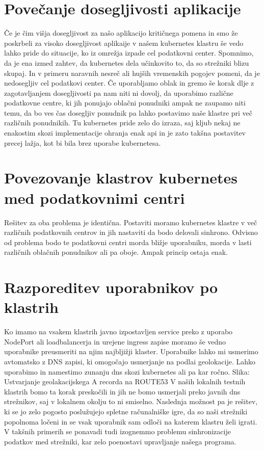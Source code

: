 \documentclass[a4paper, 12pt]{book}
\begin{document}
\section{Povečanje dosegljivosti aplikacije}
Če je čim višja dosegljivost za našo aplikacijo kritičnega pomena in smo že poskrbeli za visoko dosegljivost aplikaije v našem kubernetes klastru še vedo lahko pride do situacije, ko iz omrežja izpade cel podatkovni center.
Spomnimo, da je ena izmed zahtev, da kubernetes dela učinkovito to, da so strežniki blizu skupaj.
In v primeru naravnih nesreč ali hujših vremenskih pogojev pomeni, da je nedosegljiv cel podatkovi center.
Če uporabljamo oblak in gremo še korak dlje z zagotavljanjem dosegljivosti pa nam niti ni dovolj, da uporabimo različne podatkovne centre, ki jih ponujajo oblačni ponudniki ampak ne zaupamo niti temu, da bo ves čas dosegljiv ponudnik pa lahko postavimo naše klastre pri več različnih ponudnikih.
Tu kubernetes pride zelo do izraza, saj kljub nekaj ne enakostim skozi implementacije ohranja enak api in je zato takšna postavitev precej lažja, kot bi bila brez uporabe kubernetesa.
\section{Povezovanje klastrov kubernetes med podatkovnimi centri}
Rešitev za oba problema je identična.
Postaviti moramo kubernetes klastre v več različnih podatkovnih centrov in jih nastaviti da bodo delovali sinhrono. Odvisno od problema bodo te podatkovni centri morda bližje uporabniku, morda v lasti različnih oblačnih ponudnikov ali pa oboje. Ampak princip ostaja enak.
\section{Razporeditev uporabnikov po klastrih}
Ko imamo na vsakem klastrih javno izpostavljen service preko z uporabo NodePort ali loadbalancerja in urejene ingress zapise moramo še vedno uporabnike preusmeriti na njim najbljižji klaster.
Uporabnike lahko mi usmerimo avtomatsko z DNS zapisi, ki omogočajo usmerjanje na podlai geolokacije.
Lahko uporabimo in namestimo zunanju dns skozi kubernetes ali pa kar ročno.
Slika: Ustvarjanje geolakacijskega A recorda na ROUTE53
V naših lokalnih testnih klastrih bomo ta korak preskočili in jih ne bomo usmerjali preko javnih dns strežnikov, saj v lokalnem okolju to ni smiselno.
Naslednja možnost pa je rešitev, ki se jo zelo pogosto poslužujejo spletne računalniške igre, da so naši strežniki popolnoma ločeni in se vsak uporabnik sam odloči na katerem klastru želi igrati.
V takšnih primerih se ponavadi tudi izognemmo problemu sinhronizacije podatkov med strežniki, kar zelo poenostavi upravljanje našega programa.
\end{document}
